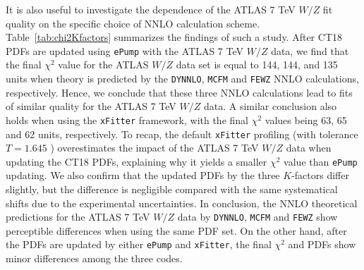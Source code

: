 It is also useful to investigate the dependence of the ATLAS 7 TeV $W/Z$ fit quality on the specific choice of NNLO calculation scheme. 
Table~\ref{tab:chi2Kfactors} summarizes the findings of such a study. 
After CT18 PDFs are updated using \texttt{ePump} with the ATLAS 7 TeV $W/Z$ data, we find that the final $\chi^2$ value for the ATLAS $W/Z$ data set
is equal to 144, 144, and 135 units when theory is predicted by the \texttt{DYNNLO}, \texttt{MCFM} and \texttt{FEWZ} NNLO calculations, respectively. 
Hence, we conclude that these three NNLO calculations lead to fits of similar quality for the ATLAS 7 TeV $W/Z$ data.
A similar conclusion also holds when using the \texttt{xFitter} framework, with the final $\chi^2$ values being 63, 65 and 62 units, respectively.
To recap, the default \texttt{xFitter} profiling (with tolerance $T\! =\! 1.645$ ) overestimates the impact of the
ATLAS 7 TeV $W/Z$ data when updating the CT18 PDFs, explaining why it yields a smaller $\chi^2$ value than \texttt{ePump} updating. We also confirm that the updated PDFs by the three $K$-factors differ slightly, but the difference is negligible compared with the same systematical shifts due to the experimental uncertainties.  
In conclusion, the NNLO theoretical predictions for the ATLAS 7 TeV $W/Z$ data by \texttt{DYNNLO}, \texttt{MCFM} and \texttt{FEWZ}  show perceptible differences when using the same PDF set. On the other hand, after the PDFs are updated by either \texttt{ePump} and \texttt{xFitter}, the final $\chi^2$ and PDFs show minor differences among the three codes.